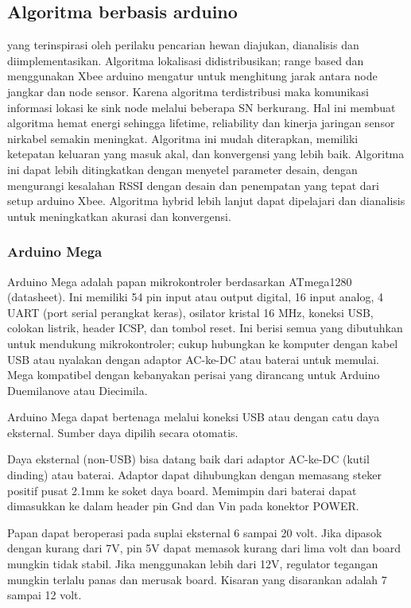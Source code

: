 \subsection{Algoritma berbasis arduino} 
yang terinspirasi oleh perilaku pencarian hewan diajukan, dianalisis dan diimplementasikan. Algoritma lokalisasi didistribusikan; range based dan menggunakan Xbee arduino mengatur untuk menghitung jarak antara node jangkar dan node sensor. Karena algoritma terdistribusi maka komunikasi informasi lokasi ke sink node melalui beberapa SN berkurang. Hal ini membuat algoritma hemat energi sehingga lifetime, reliability dan kinerja jaringan sensor nirkabel semakin meningkat. Algoritma ini mudah diterapkan, memiliki ketepatan keluaran yang masuk akal, dan konvergensi yang lebih baik. Algoritma ini dapat lebih ditingkatkan dengan menyetel parameter desain, dengan mengurangi kesalahan RSSI dengan desain dan penempatan yang tepat dari setup arduino Xbee. Algoritma hybrid lebih lanjut dapat dipelajari dan dianalisis untuk meningkatkan akurasi dan konvergensi.

\subsubsection{Arduino Mega}

Arduino Mega adalah papan mikrokontroler berdasarkan ATmega1280 (datasheet). Ini memiliki 54 pin input atau output digital, 16 input analog, 4 UART (port serial perangkat keras), osilator kristal 16 MHz, koneksi USB, colokan listrik, header ICSP, dan tombol reset. Ini berisi semua yang dibutuhkan untuk mendukung mikrokontroler; cukup hubungkan ke komputer dengan kabel USB atau nyalakan dengan adaptor AC-ke-DC atau baterai untuk memulai. Mega kompatibel dengan kebanyakan perisai yang dirancang untuk Arduino Duemilanove atau Diecimila.

Arduino Mega dapat bertenaga melalui koneksi USB atau dengan catu daya eksternal. Sumber daya dipilih secara otomatis.

Daya eksternal (non-USB) bisa datang baik dari adaptor AC-ke-DC (kutil dinding) atau baterai. Adaptor dapat dihubungkan dengan memasang steker positif pusat 2.1mm ke soket daya board. Memimpin dari baterai dapat dimasukkan ke dalam header pin Gnd dan Vin pada konektor POWER.

Papan dapat beroperasi pada suplai eksternal 6 sampai 20 volt. Jika dipasok dengan kurang dari 7V, pin 5V dapat memasok kurang dari lima volt dan board mungkin tidak stabil. Jika menggunakan lebih dari 12V, regulator tegangan mungkin terlalu panas dan merusak board. Kisaran yang disarankan adalah 7 sampai 12 volt.

